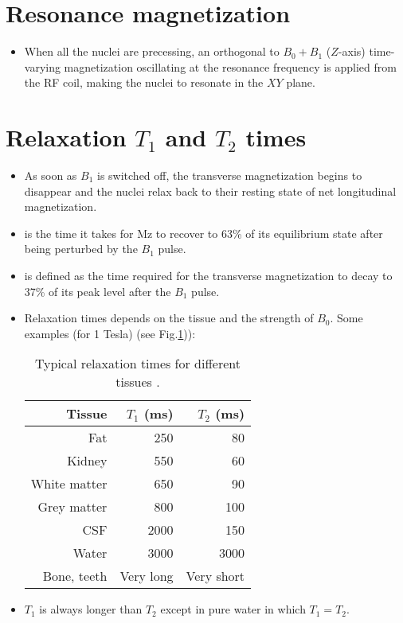 \section{Resonance magnetization}
\begin{itemize}
\item When all the nuclei are precessing, an orthogonal to $B_0+B_1$
  ($Z$-axis) time-varying magnetization oscillating at the resonance
  frequency is applied from the RF coil, making the nuclei to resonate
  in the $XY$ plane.
\end{itemize}

\section{Relaxation $T_1$ and $T_2$ times}
\begin{itemize}
\item As soon as $B_1$ is switched off, the transverse magnetization
  begins to disappear and the nuclei relax back to their resting state
  of net longitudinal magnetization. 
\item {} is the time it takes for Mz to recover to 63\% of its
  equilibrium state after being perturbed by the $B_1$ pulse.
\item {} is
  defined as the time required for the transverse magnetization to
  decay to 37\% of its peak level after the $B_1$ pulse.
\end{itemize}

\begin{itemize}
\item Relaxation times depends on the tissue and the strength of
  $B_0$. Some examples (for 1 Tesla) (see Fig.\ref{tab:relaxation_times})):
  \begin{table}
    \begin{center}
      \begin{tabular}{r|rr}
        Tissue & $T_1$ (ms) & $T_2$ (ms) \\
        \hline
        Fat & 250 & 80 \\
        Kidney & 550 &  60 \\
        White matter & 650 & 90 \\
        Grey matter & 800 & 100 \\
        CSF & 2000 & 150 \\
        Water & 3000 & 3000 \\
        Bone, teeth & Very long & Very short
      \end{tabular}
      \caption{Typical relaxation times for different tissues
        \cite{abdulla2025MRI_T1T2}.}
      \label{tab:relaxation_times}
    \end{center}
  \end{table}
\item $T_1$ is always longer than $T_2$ except in pure water in which
  $T_1=T_2$.
\end{itemize}


